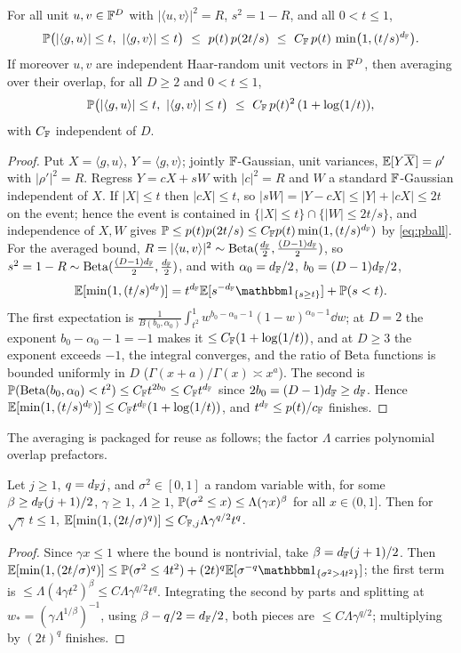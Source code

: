 \begin{lemma}\label{lem:twoslab}
For all unit $u,v\in\mathbb{F}^D$ with $|\langle u,v\rangle|^2=R$, $s^2=1-R$, and all $0<t\le1$,
\begin{equation}\label{eq:cond}
  \PP\bigl(|\langle g,u\rangle|\le t,\ |\langle g,v\rangle|\le t\bigr)\ \le\ p(t)\,p(2t/s)\ \le\
  C_\F\,p(t)\,\min\bigl(1,(t/s)^{\dF}\bigr).
\end{equation}
If moreover $u,v$ are independent Haar-random unit vectors in $\mathbb{F}^D$, then averaging over their overlap,
for all $D\ge2$ and $0<t\le1$,
\[
  \PP\bigl(|\langle g,u\rangle|\le t,\ |\langle g,v\rangle|\le t\bigr)\ \le\ C_\F\,p(t)^2\,(1+\log(1/t)),
\]
with $C_{\mathbb{F}}$ independent of $D$.
\end{lemma}
\begin{proof}
Put $X=\langle g,u\rangle$, $Y=\langle g,v\rangle$; jointly $\mathbb{F}$-Gaussian, unit variances,
$\mathbb{E}[Y\overline X]=\rho'$ with $|\rho'|^2=R$. Regress $Y=cX+sW$ with $|c|^2=R$ and $W$ a standard
$\mathbb{F}$-Gaussian independent of $X$. If $|X|\le t$ then $|cX|\le t$, so $|sW|=|Y-cX|\le|Y|+|cX|\le2t$ on the
event; hence the event is contained in $\{|X|\le t\}\cap\{|W|\le2t/s\}$, and independence of $X,W$ gives
$\mathbb{P}\le p(t)p(2t/s)\le C_{\mathbb{F}} p(t)\min(1,(t/s)^{d_{\mathbb{F}}})$ by \eqref{eq:pball}. For the averaged bound,
$R=|\langle u,v\rangle|^2\sim\operatorname{Beta}(\tfrac{d_{\mathbb{F}}}2,\tfrac{(D-1)d_{\mathbb{F}}}2)$, so $s^2=1-R\sim\operatorname{Beta}(\tfrac{(D-1)d_{\mathbb{F}}}2,\tfrac{d_{\mathbb{F}}}2)$,
and with $\alpha_0=d_{\mathbb{F}}/2$, $b_0=(D-1)d_{\mathbb{F}}/2$,
\[
  \EE[\min(1,(t/s)^{\dF})]=t^{\dF}\EE[s^{-\dF}\one_{\{s\ge t\}}]+\PP(s<t).
\]
The first expectation is $\tfrac1{B(b_0,\alpha_0)}\int_{t^2}^1 w^{b_0-\alpha_0-1}(1-w)^{\alpha_0-1}\dd w$;
at $D=2$ the exponent $b_0-\alpha_0-1=-1$ makes it $\le C_{\mathbb{F}}(1+\log(1/t))$, and at $D\ge3$ the exponent
exceeds $-1$, the integral converges, and the ratio of Beta functions is bounded uniformly in $D$
($\Gamma(x+a)/\Gamma(x)\asymp x^a$). The second is $\mathbb{P}(\operatorname{Beta}(b_0,\alpha_0)<t^2)\le C_{\mathbb{F}} t^{2b_0}\le
C_{\mathbb{F}} t^{d_{\mathbb{F}}}$ since $2b_0=(D-1)d_{\mathbb{F}}\ge d_{\mathbb{F}}$. Hence $\mathbb{E}[\min(1,(t/s)^{d_{\mathbb{F}}})]\le C_{\mathbb{F}} t^{d_{\mathbb{F}}}(1+\log(1/t))$,
and $t^{d_{\mathbb{F}}}\le p(t)/c_{\mathbb{F}}$ finishes.
\end{proof}

The averaging is packaged for reuse as follows; the factor $\Lambda$ carries polynomial overlap
prefactors.

\begin{lemma}\label{lem:averaged}
Let $j\ge1$, $q=d_{\mathbb{F}} j$, and $\sigma^2\in[0,1]$ a random variable with, for some $\beta\ge d_{\mathbb{F}}(j+1)/2$,
$\gamma\ge1$, $\Lambda\ge1$, $\mathbb{P}(\sigma^2\le x)\le\Lambda(\gamma x)^\beta$ for all $x\in(0,1]$. Then for
$\sqrt\gamma\,t\le1$, $\mathbb{E}[\min(1,(2t/\sigma)^q)]\le C_{\mathbb{F},j}\Lambda\gamma^{q/2}t^q$.
\end{lemma}
\begin{proof}
Since $\gamma x\le1$ where the bound is nontrivial, take $\beta=d_{\mathbb{F}}(j+1)/2$. Then
$\EE[\min(1,(2t/\sigma)^q)]\le\PP(\sigma^2\le4t^2)+(2t)^q\EE[\sigma^{-q}\one_{\{\sigma^2>4t^2\}}]$; the
first term is $\le\Lambda(4\gamma t^2)^\beta\le C\Lambda\gamma^{q/2}t^q$. Integrating the second by parts
and splitting at $w_*=(\gamma\Lambda^{1/\beta})^{-1}$, using $\beta-q/2=d_{\mathbb{F}}/2$, both pieces are
$\le C\Lambda\gamma^{q/2}$; multiplying by $(2t)^q$ finishes.
\end{proof}

